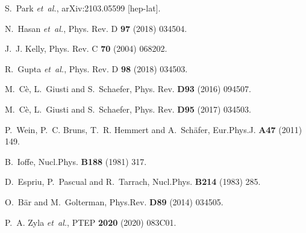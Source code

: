 \documentclass[11pt,prd,aps,showpacs,eqsecnum,floatfix,nofootinbib,preprint,tightenlines]{revtex4}
\begin{document}
\begin{thebibliography}{10}
S.~Park {\em et~al.},
\newblock arXiv:2103.05599 [hep-lat].

N.~Hasan {\em et~al.},
\newblock Phys. Rev. D {\bf 97} (2018) 034504.

J.~J. Kelly,
\newblock Phys. Rev. C {\bf 70} (2004) 068202.

R.~Gupta {\em et~al.},
\newblock Phys. Rev. D {\bf 98} (2018) 034503.

M.~C\`{e}, L.~Giusti and S.~Schaefer,
\newblock Phys. Rev. {\bf D93} (2016) 094507.

M.~C\`{e}, L.~Giusti and S.~Schaefer,
\newblock Phys. Rev. {\bf D95} (2017) 034503.

P.~Wein, P.~C. Bruns, T.~R. Hemmert and A.~Sch{\"a}fer,
\newblock Eur.Phys.J. {\bf A47} (2011) 149.

B.~Ioffe,
\newblock Nucl.Phys. {\bf B188} (1981) 317.

D.~Espriu, P.~Pascual and R.~Tarrach,
\newblock Nucl.Phys. {\bf B214} (1983) 285.

O.~B{\"a}r and M.~Golterman,
\newblock Phys.Rev. {\bf D89} (2014) 034505.

P.~A. Zyla {\em et~al.},
\newblock PTEP {\bf 2020} (2020) 083C01.

\end{thebibliography}

\end{document}
